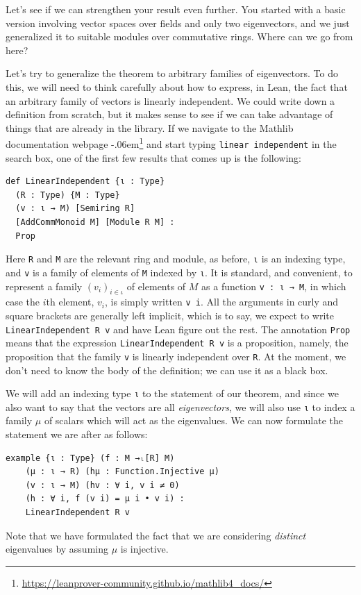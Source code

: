 \documentclass[11pt]{article}
\def\lean{\lstinline[language=lean]}
\begin{document}
Let's see if we can strengthen your result even further.
You started with a basic version involving vector spaces over fields and only two eigenvectors,
and we just generalized it to suitable modules over commutative rings.
Where can we go from here?

Let's try to generalize the theorem to
arbitrary families of eigenvectors.
To do this, we will need to think carefully about how to express,
in Lean, the fact that an arbitrary family of vectors is linearly independent.
We could write down a definition from scratch, but it makes sense to see if we can take advantage of things that are already in the library.
If we navigate to the Mathlib documentation webpage%
\kern-.06em\footnote{\url{https://leanprover-community.github.io/mathlib4_docs/}}
and start typing \texttt{linear independent} in the search box,
one of the first few results that comes up is the following:
\begin{lstlisting}
def LinearIndependent {ι : Type}
  (R : Type) {M : Type}
  (v : ι → M) [Semiring R]
  [AddCommMonoid M] [Module R M] :
  Prop
\end{lstlisting}
Here \lean"R" and \lean"M" are the relevant ring and module, as before, \lean"ι" is an indexing type, and \lean"v" is a family of elements of
\lean"M" indexed by \lean"ι".
It is standard, and convenient, to
represent a family $(v_i)_{i \in \iota}$ of elements of $M$ as a function \lstinline{v : ι → M},
in which case the $i$th element, $v_i$, is simply written \lstinline{v i}.
All the arguments in curly and square brackets are generally left implicit, which is to say, we expect to write \lean"LinearIndependent R v" and have Lean figure out the rest.
The annotation \lean"Prop" means that the expression
\lean"LinearIndependent R v" is a proposition, namely, the proposition that the family \lean"v" is linearly independent over \lean"R".
At the moment, we don't need to know the body of the definition; we can use it as a black box.

We will add an indexing type \lean"ι" to the statement of our theorem, and since we also want to say that the
vectors are all \emph{eigenvectors}, we will also use \lean"ι" to index a family $\mu$ of scalars which will act as the eigenvalues.
We can now formulate the statement we are after as follows:
\begin{lstlisting}
example {ι : Type} (f : M →ₗ[R] M)
    (μ : ι → R) (hμ : Function.Injective μ)
    (v : ι → M) (hv : ∀ i, v i ≠ 0)
    (h : ∀ i, f (v i) = μ i • v i) :
    LinearIndependent R v
\end{lstlisting}
Note that we have formulated the fact that we are considering \emph{distinct} eigenvalues by assuming $\mu$ is injective.
\end{document}
